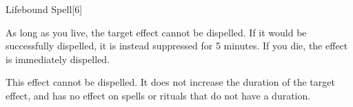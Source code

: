 \begin{spellsection}{Lifebound Spell}[6]
    \begin{spellheader}
    \end{spellheader}
    \begin{spellcontent}
        \begin{spelltargetinginfo}
        \end{spelltargetinginfo}
        \begin{spelleffects}
            \spelleffect As long as you live, the target effect cannot be dispelled.
            If it would be successfully dispelled, it is instead suppressed for 5 minutes.
            If you die, the effect is immediately dispelled.
        \end{spelleffects}
    \end{spellcontent}
    \begin{spellfooter}
        \spellnotes This effect cannot be dispelled.
        It does not increase the duration of the target effect, and has no effect on spells or rituals that do not have a duration.
        \miscastexplode
    \end{spellfooter}
\end{spellsection}


